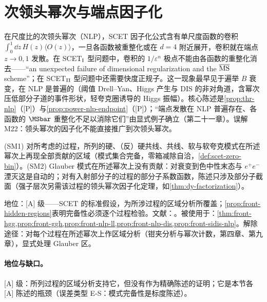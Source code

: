 \section{次领头幂次与端点因子化}\label{sec:front-nlp}

在尺度比的次领头幂次（NLP），SCET 因子化公式含有单尺度函数的卷积 $\int_0^1\dd z\,H(z)\langle O(z)\rangle$，一旦各函数被重整化或在 $d=4$ 附近展开，卷积就在端点 $z\to0,1$ 发散。在 SCET$_{\rm I}$ 型问题中，卷积的 $1/\varepsilon^n$ 极点不能由各函数的重整化消去——“an unexpected failure of dimensional regularization and the $\overline{\rm MS}$ scheme”\cite{Liu:2019oav}；在 SCET$_{\rm II}$ 型问题中还需要快度正规子。这一现象最早见于遍举 $B$ 衰变，在 NLP 是普遍的（阈值 Drell--Yan、Higgs 产生与 DIS 的非对角道，含幂次压低部分子道的事件形状，轻夸克圈诱导的 Higgs 振幅）。核心陈述是\cref{prop:thr-nlp}（[P]）与\cref{prop:power-nlp-endpoint}（[P]）；“端点发散在 NLP 普遍存在、各函数的 $\MSbar$ 重整化不足以消除它们”由显式例子确立（第二十一章）。误解 M22：领头幂次的因子化不能直接推广到次领头幂次。

\begin{assumption}\label{asm:front-scet-modes}
(SM1) 对所考虑的过程，所列的硬、（反）硬共线、共线、软与软夸克模式在所述幂次上再现全部贡献的区域（模式集合完备，零箱减除自洽，\cref{def:scet-zero-bin}）。(SM2) Glauber 模式在所述幂次上没有贡献：对衰变到色中性末态与 $e^+e^-$ 湮灭这是自动的；对有入射部分子的过程的部分子系数函数，陈述只涉及部分子截面（强子层次另需该过程的领头幂次因子化定理，如\cref{thm:dy-factorization}）。

地位：[A] 级——SCET 的标准假设，为所涉过程的区域分析所覆盖；\cref{prop:front-hidden-regions}表明完备性必须逐个过程检验。文献：\cite{Liu:2019oav,Liu:2020wbn,Beneke:2022obx,RothsteinStewart2016}。被使用于：\cref{thm:front-hgg,prop:front-ggh,prop:front-nlp-ll,prop:front-nlp-dis,prop:front-sidis-nlp}。解除途径：对每个过程在所述幂次上作区域分析（钳夹分析与幂次计数，第四章、第九章），显式处理 Glauber 区。
\end{assumption}

\paragraph{地位与缺口。}[A] 级：所列过程的区域分析支持它，但没有作为精确陈述的证明；它是本节各 [A] 陈述的瓶颈（误差类型 E-S：模式完备性是标度陈述）。

